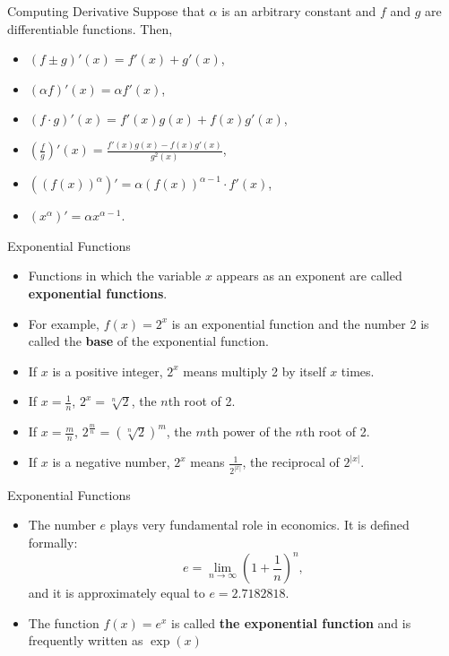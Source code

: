 \documentclass{beamer}
\begin{document}
\begin{frame}{Computing Derivative}
Suppose that $\alpha$ is an arbitrary constant and $f$ and $g$ are differentiable functions. Then, 
    \begin{itemize}
        \item $(f\pm g)'(x)=f'(x)+g'(x)$,
        \item $(\alpha f)'(x)=\alpha f'(x)$, 
        \item $(f\cdot g)'(x)=f'(x)g(x)+f(x)g'(x)$,
        \item $(\frac{f}{g})'(x)=\frac{f'(x)g(x)-f(x)g'(x)}{g^2(x)}$,
        \item $(( f(x))^\alpha)'=\alpha(f(x))^{\alpha-1}\cdot f'(x)$,
        \item $(x^\alpha)'=\alpha x^{\alpha-1}$.
    \end{itemize}
\end{frame}

\begin{frame}{Exponential Functions}
    \begin{itemize}
        \item Functions in which the variable $x$ appears as an exponent are called \textbf{exponential functions}. 
        \item For example, $f(x)=2^x$ is an exponential function and the number 2 is called the \textbf{base} of the exponential function. 
        \item If $x$ is a positive integer, $2^x$ means multiply 2 by itself $x $ times. 
        \item If $x=\frac{1}{n}$, $2^x=\sqrt[n]{2}$, the $n$th root of 2. 
        \item If $x=\frac{m}{n}$, $2^{\frac{m}{n}}=(\sqrt[n]{2})^m$, the $m$th power of the $n$th root of 2. 
        \item If $x$ is a negative number, $2^x$ means $\frac{1}{2^{|x|}}$, the reciprocal of $2^{|x|}$.
    \end{itemize}
    \end{frame}

\begin{frame}{Exponential Functions}
\begin{itemize}
    \item The number $e$ plays very fundamental role in economics. It is defined formally:
    \[e=\lim_{n\to \infty }(1+\frac{1}{n})^n,
    \]
    and it is approximately equal to $e=2.7182818.$
    \item The function $f(x)=e^x$ is called \textbf{the exponential function} and is frequently written as $\exp(x)$
\end{itemize}
\end{frame}
\end{document}
